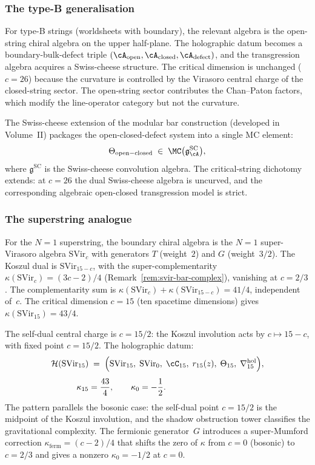 \subsubsection*{The type-B generalisation}

For type-B strings (worldsheets with boundary), the relevant
algebra is the open-string chiral algebra on the upper
half-plane. The holographic datum becomes a boundary-bulk-defect
triple $(\cA_{\mathrm{open}},\cA_{\mathrm{closed}},
\cA_{\mathrm{defect}})$, and the transgression algebra acquires
a Swiss-cheese structure. The critical dimension is unchanged
($c=26$) because the curvature is controlled by the Virasoro
central charge of the closed-string sector. The open-string
sector contributes the Chan--Paton factors, which modify the
line-operator category but not the curvature.

The Swiss-cheese extension of the modular bar construction
(developed in Volume~II) packages the open-closed-defect system
into a single MC element:
\[
\Theta_{\mathrm{open-closed}}
\;\in\;
\MC\bigl(\mathfrak g^{\mathrm{SC}}_\cA\bigr),
\]
where $\mathfrak g^{\mathrm{SC}}$ is the Swiss-cheese convolution
algebra. The critical-string dichotomy extends: at $c=26$ the
dual Swiss-cheese algebra is uncurved, and the corresponding
algebraic open-closed transgression model is strict.

\subsubsection*{The superstring analogue}

For the $N=1$ superstring, the boundary chiral algebra is the
$N=1$ super-Virasoro algebra $\mathrm{SVir}_c$ with generators
$T$ (weight~$2$) and $G$ (weight~$3/2$). The Koszul dual is
$\mathrm{SVir}_{15-c}$, with the super-complementarity
$\kappa(\mathrm{SVir}_c)=(3c-2)/4$
(Remark~\ref{rem:svir-bar-complex}), vanishing at $c=2/3$.
The complementarity sum is
$\kappa(\mathrm{SVir}_c)+\kappa(\mathrm{SVir}_{15-c})=41/4$,
independent of~$c$. The
critical dimension $c=15$ (ten spacetime dimensions) gives
$\kappa(\mathrm{SVir}_{15})=43/4$.

The self-dual central charge is $c=15/2$: the Koszul involution
acts by $c\mapsto 15-c$, with fixed point $c=15/2$. The
holographic datum:
\begin{align*}
\mathcal H(\mathrm{SVir}_{15})
&\;=\;
\Bigl(
\mathrm{SVir}_{15},\;\mathrm{SVir}_0,\;\cC_{15},\;
r_{15}(z),\;\Theta_{15},\;\nabla^{\mathrm{hol}}_{15}
\Bigr),\\[4pt]
\kappa_{15}&=\frac{43}{4},
\qquad
\kappa_0=-\frac{1}{2}.
\end{align*}
The pattern parallels the bosonic case: the self-dual point $c=15/2$ is
the midpoint of the Koszul involution, and the shadow obstruction tower
classifies the gravitational complexity. The fermionic generator~$G$
introduces a super-Mumford correction $\kappa_{\mathrm{ferm}}=(c-2)/4$
that shifts the zero of $\kappa$ from $c=0$ (bosonic) to $c=2/3$ and
gives a nonzero $\kappa_0=-1/2$ at $c=0$.

